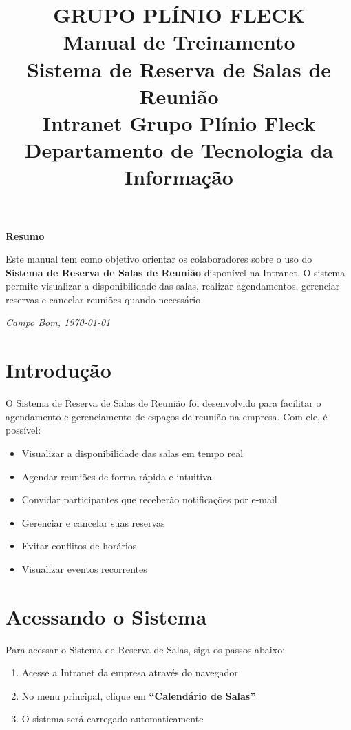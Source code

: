 \documentclass[12pt,a4paper]{article}
\title{
    \begin{center}
        \vspace*{-3cm}
        {\Large\textbf{GRUPO PLÍNIO FLECK}}\\[1cm]
        {\Huge\textbf{Manual de Treinamento}}\\[0.5cm]
        {\Large Sistema de Reserva de Salas de Reunião}\\[0.3cm]
        {\large Intranet Grupo Plínio Fleck}\\[3cm]
        {\normalsize \textbf{Departamento de Tecnologia da Informação}}\\[0.3cm]
    \end{center}
}
\author{}
\date{}
\begin{document}
\maketitle
\thispagestyle{empty}

\vspace{2cm}

\begin{center}
\textbf{Resumo}
\end{center}

\noindent
Este manual tem como objetivo orientar os colaboradores sobre o uso do \textbf{Sistema de Reserva de Salas de Reunião} disponível na Intranet. O sistema permite visualizar a disponibilidade das salas, realizar agendamentos, gerenciar reservas e cancelar reuniões quando necessário.

\vfill
\begin{center}
    \textit{Campo Bom, \today}
\end{center}
\newpage
\tableofcontents
\newpage

\section{Introdução}

O Sistema de Reserva de Salas de Reunião foi desenvolvido para facilitar o agendamento e gerenciamento de espaços de reunião na empresa. Com ele, é possível:

\begin{itemize}[leftmargin=*]
    \item Visualizar a disponibilidade das salas em tempo real
    \item Agendar reuniões de forma rápida e intuitiva
    \item Convidar participantes que receberão notificações por e-mail
    \item Gerenciar e cancelar suas reservas
    \item Evitar conflitos de horários
    \item Visualizar eventos recorrentes
\end{itemize}

\section{Acessando o Sistema}

Para acessar o Sistema de Reserva de Salas, siga os passos abaixo:

\begin{enumerate}[leftmargin=*]
    \item Acesse a Intranet da empresa através do navegador
    \item No menu principal, clique em \textbf{``Calendário de Salas''}
    \item O sistema será carregado automaticamente
\end{enumerate}
\end{document}
